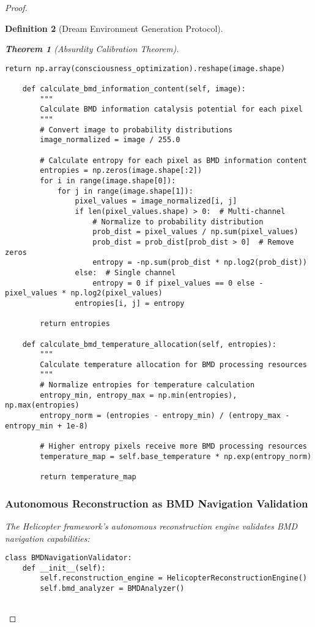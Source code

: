 \documentclass[12pt,a4paper]{article}
\newtheorem{theorem}{Theorem}[section]
\newtheorem{definition}[theorem]{Definition}
\begin{document}
\begin{proof}
\begin{definition}[Dream Environment Generation Protocol]
\begin{theorem}[Absurdity Calibration Theorem]
\begin{lstlisting}[style=pythonstyle, caption=BMD Thermodynamic Pixel Processing]
        return np.array(consciousness_optimization).reshape(image.shape)
    
    def calculate_bmd_information_content(self, image):
        """
        Calculate BMD information catalysis potential for each pixel
        """
        # Convert image to probability distributions
        image_normalized = image / 255.0
        
        # Calculate entropy for each pixel as BMD information content
        entropies = np.zeros(image.shape[:2])
        for i in range(image.shape[0]):
            for j in range(image.shape[1]):
                pixel_values = image_normalized[i, j]
                if len(pixel_values.shape) > 0:  # Multi-channel
                    # Normalize to probability distribution
                    prob_dist = pixel_values / np.sum(pixel_values)
                    prob_dist = prob_dist[prob_dist > 0]  # Remove zeros
                    entropy = -np.sum(prob_dist * np.log2(prob_dist))
                else:  # Single channel
                    entropy = 0 if pixel_values == 0 else -pixel_values * np.log2(pixel_values)
                entropies[i, j] = entropy
        
        return entropies
    
    def calculate_bmd_temperature_allocation(self, entropies):
        """
        Calculate temperature allocation for BMD processing resources
        """
        # Normalize entropies for temperature calculation
        entropy_min, entropy_max = np.min(entropies), np.max(entropies)
        entropy_norm = (entropies - entropy_min) / (entropy_max - entropy_min + 1e-8)
        
        # Higher entropy pixels receive more BMD processing resources
        temperature_map = self.base_temperature * np.exp(entropy_norm)
        
        return temperature_map
\end{lstlisting}

\subsubsection{Autonomous Reconstruction as BMD Navigation Validation}

The Helicopter framework's autonomous reconstruction engine validates BMD navigation capabilities:

\begin{lstlisting}[style=pythonstyle, caption=BMD Navigation Validation Through Visual Reconstruction]
class BMDNavigationValidator:
    def __init__(self):
        self.reconstruction_engine = HelicopterReconstructionEngine()
        self.bmd_analyzer = BMDAnalyzer()
        

\end{lstlisting}
\end{theorem}
\end{definition}
\end{proof}
\end{document}

